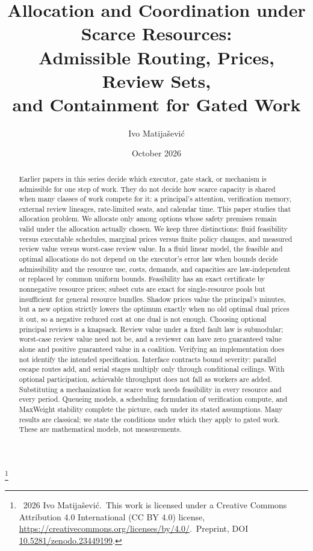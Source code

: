 \documentclass[11pt]{article}
\title{Allocation and Coordination under Scarce Resources:\\Admissible Routing, Prices, Review Sets,\\and Containment for Gated Work}
\author{Ivo Matija\v{s}evi\'c}
\date{October 2026}
\theoremstyle{definition}
\theoremstyle{remark}
\newcommand\blfootnote[1]{\begingroup\renewcommand\thefootnote{}\footnote{#1}\addtocounter{footnote}{-1}\endgroup}
\begin{document}
\maketitle
\blfootnote{\textcopyright~2026 Ivo Matija\v{s}evi\'c.\ This work is licensed under a Creative Commons
Attribution 4.0 International (CC BY 4.0) license, \url{https://creativecommons.org/licenses/by/4.0/}.\ Preprint, DOI \href{https://doi.org/10.5281/zenodo.23449199}{10.5281/zenodo.23449199}.}
\begin{abstract}
Earlier papers in this series decide which executor, gate stack, or mechanism is admissible for one
step of work. They do not decide how scarce capacity is shared when many classes of work compete for
it: a principal's attention, verification memory, external review lineages, rate-limited seats, and
calendar time. This paper studies that allocation problem. We allocate only among options whose
safety premises remain valid under the allocation actually chosen. We keep three distinctions: fluid
feasibility versus executable schedules, marginal prices versus finite policy changes, and measured
review value versus worst-case review value. In a fluid linear model, the feasible and optimal
allocations do not depend on the executor's error law when bounds decide admissibility and the
resource use, costs, demands, and capacities are law-independent or replaced by common uniform bounds.
Feasibility has an exact certificate by nonnegative resource prices; subset cuts are exact for
single-resource pools but insufficient for general resource bundles. Shadow prices value the principal's minutes, but a new option strictly lowers the optimum
exactly when no old optimal dual prices it out, so a negative reduced cost at one dual is not enough.
Choosing optional principal reviews is a knapsack. Review value under a fixed fault law is submodular;
worst-case review value need not be, and a reviewer can have zero guaranteed value alone and positive
guaranteed value in a coalition. Verifying an implementation does not identify the intended
specification. Interface contracts bound severity: parallel escape routes add, and serial stages
multiply only through conditional ceilings. With optional participation, achievable throughput does not
fall as workers are added. Substituting a mechanization for scarce work needs feasibility in every
resource and every period. Queueing models, a scheduling formulation of verification compute, and
MaxWeight stability complete the picture, each under its stated assumptions. Many results are
classical; we state the conditions under which they apply to gated work. These are mathematical
models, not measurements.
\end{abstract}
\end{document}
